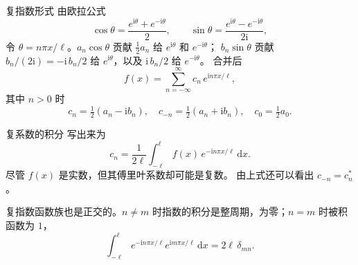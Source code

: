 \documentclass[fontset=windows, chinese, 10pt, xcolor=dvipsnames]{beamer}
\begin{document}
\begin{frame}{复指数形式}
  由欧拉公式
  \begin{equation*}
    \cos\theta=\frac{e^{\mathrm{i}\theta}+e^{-\mathrm{i}\theta}}{2},
    \qquad
    \sin\theta=\frac{e^{\mathrm{i}\theta}-e^{-\mathrm{i}\theta}}{2\mathrm{i}},
  \end{equation*}
  令 $\theta=n\pi x/\ell$。$a_n\cos\theta$ 贡献 $\tfrac12 a_n$ 给 $e^{\mathrm{i}\theta}$ 和 $e^{-\mathrm{i}\theta}$；
  $b_n\sin\theta$ 贡献 $b_n/(2\mathrm{i})=-\mathrm{i}\,b_n/2$ 给 $e^{\mathrm{i}\theta}$，以及 $\mathrm{i}\,b_n/2$ 给 $e^{-\mathrm{i}\theta}$。
  合并后
  \begin{equation*}
    f(x)=\sum_{n=-\infty}^{\infty}
      c_n\,e^{\mathrm{i} n\pi x/\ell},
  \end{equation*}
  其中 $n>0$ 时
  \begin{equation*}
    c_n=\tfrac12(a_n-\mathrm{i} b_n),
    \quad
    c_{-n}=\tfrac12(a_n+\mathrm{i} b_n),
    \quad
    c_0=\tfrac12 a_0.
  \end{equation*}
\end{frame}

\begin{frame}{复系数的积分}
  写出来为
  \begin{equation*}
    c_n=\frac{1}{2\ell}\int_{-\ell}^{\ell}
      f(x)\,e^{-\mathrm{i} n\pi x/\ell}\,\mathrm{d}x.
  \end{equation*}
  尽管 $f(x)$ 是实数，但其傅里叶系数却可能是复数。
  由上式还可以看出 $c_{-n}=c_n^*$。
  \vspace{0.4em}

  复指数函数族也是正交的。$n\neq m$ 时指数的积分是整周期，为零；$n=m$ 时被积函数为 $1$，
  \begin{equation*}
    \int_{-\ell}^{\ell}
      e^{-\mathrm{i} n\pi x/\ell}
      e^{\mathrm{i} m\pi x/\ell}\,\mathrm{d}x
    =2\ell\,\delta_{mn}.
  \end{equation*}
\end{frame}
\end{document}
